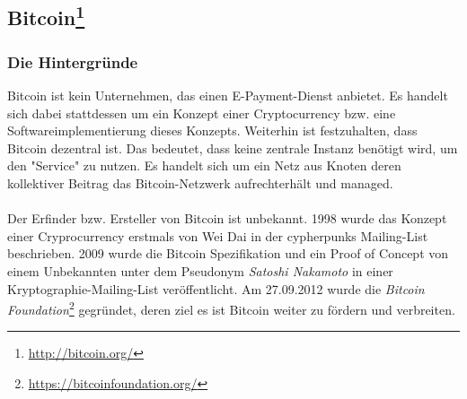 \subsection[Bitcoin]{Bitcoin\footnote{\url{http://bitcoin.org/}}}
\subsubsection{Die Hintergründe}
Bitcoin ist kein Unternehmen, das einen E-Payment-Dienst anbietet. Es handelt sich dabei stattdessen um ein Konzept einer Cryptocurrency bzw. eine Softwareimplementierung dieses Konzepts. Weiterhin ist festzuhalten, dass Bitcoin dezentral ist. Das bedeutet, dass keine zentrale Instanz benötigt wird, um den "Service" zu nutzen. Es handelt sich um ein Netz aus Knoten deren kollektiver Beitrag das Bitcoin-Netzwerk aufrechterhält und managed.\\
\\
Der Erfinder bzw. Ersteller von Bitcoin ist unbekannt. 1998 wurde das Konzept einer Cryprocurrency erstmals von Wei Dai in der cypherpunks Mailing-List beschrieben. 2009 wurde die Bitcoin Spezifikation und ein Proof of Concept von einem Unbekannten unter dem Pseudonym \emph{Satoshi Nakamoto} in einer Kryptographie-Mailing-List veröffentlicht. Am 27.09.2012 wurde die \emph{Bitcoin Foundation}\footnote{\url{https://bitcoinfoundation.org/}} gegründet, deren ziel es ist Bitcoin weiter zu fördern und verbreiten.

